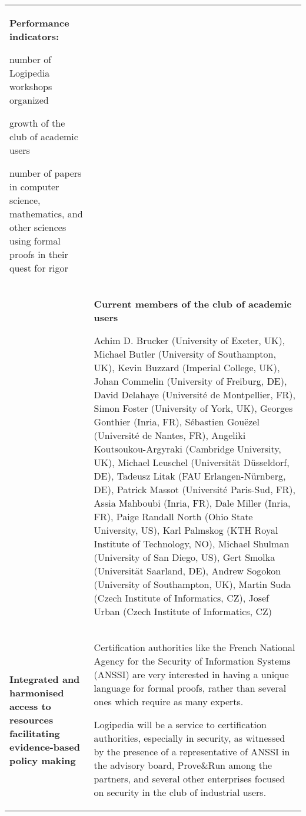 \begin{longtable}{|p{}|p{}|}
\colorbox{color2}{\bf Performance indicators:}
\begin{compactitem}
\item number of Logipedia workshops organized
\item growth of the club of academic users
\item number of papers in computer science, mathematics, and other sciences
  using formal proofs in their quest for rigor
\end{compactitem}
\\
&
\definecolor{shadecolor}{named}{color1}
\begin{shaded}
\begin{center}
  {\bf\large Current members of the club of academic users}
\end{center}
Achim D. Brucker (University of Exeter, UK),
Michael Butler (University of Southampton, UK),
Kevin Buzzard (Imperial College, UK),
Johan Commelin (University of Freiburg, DE),
David Delahaye (Université de Montpellier, FR),
Simon Foster (University of York, UK),
Georges Gonthier (Inria, FR),
Sébastien Gouëzel (Université de Nantes, FR),
Angeliki Koutsoukou-Argyraki (Cambridge University, UK),
Michael Leuschel (Universität Düsseldorf, DE),
Tadeusz Litak (FAU Erlangen-Nürnberg, DE),
Patrick Massot (Université Paris-Sud, FR),
Assia Mahboubi (Inria, FR),
Dale Miller (Inria, FR),
Paige Randall North (Ohio State University, US),
Karl Palmskog (KTH Royal Institute of Technology, NO),
Michael Shulman (University of San Diego, US),
Gert Smolka (Universität Saarland, DE),
Andrew Sogokon (University of Southampton, UK),
Martin Suda (Czech Institute of Informatics, CZ),
Josef Urban (Czech Institute of Informatics, CZ)
\end{shaded}
\\
\hline
{\bf Integrated and harmonised access to resources facilitating evidence-based policy making}
&
Certification authorities like the French National Agency for the
Security of Information Systems (ANSSI) are very interested in having
a unique language for formal proofs, rather than several ones which
require as many experts.

Logipedia will be a service to
certification authorities, especially in security, as witnessed by the
presence of a representative of ANSSI in the advisory board,
Prove\&Run among the partners, and several other enterprises focused on
security in the club of industrial users.


\end{longtable}
